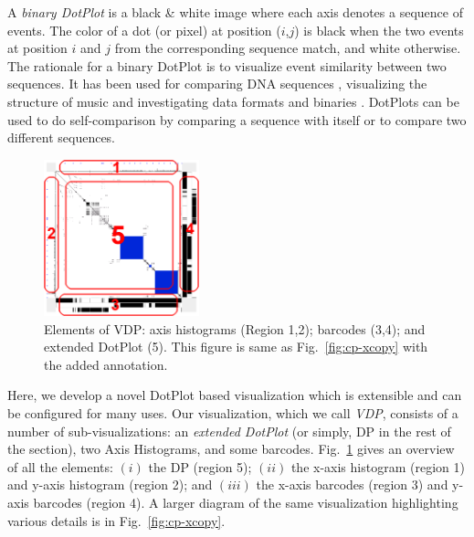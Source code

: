 
A {\em binary DotPlot} is a black \& white image
where each axis denotes a sequence of events.
The color of a dot (or pixel) at position ($i$,$j$) is black
when the two events at position $i$ and $j$ from the corresponding sequence
match, and white otherwise.
The rationale for a binary DotPlot is to visualize event similarity
between two sequences.
It has been used for comparing DNA sequences \cite{maizel1981enhanced},
visualizing the structure of music \cite{foote1999visualizing}
and investigating data formats and binaries \cite{kaminsky2006black}.
DotPlots can be used to do self-comparison
by comparing a sequence with itself or to compare
two different sequences.

\begin{figure}[tb]
\begin{center}
\includegraphics[width=0.4\textwidth]{lviz/elements.png}
\caption{Elements of VDP: axis histograms (Region 1,2);
barcodes (3,4); and extended DotPlot (5). This figure is same as
Fig.~\ref{fig:cp-xcopy} with the added annotation.}
\label{fig:elements}
\end{center}
\end{figure}

Here, we develop a novel DotPlot based visualization which is
extensible and can be configured for many uses.
Our visualization, which we call {\em VDP},
consists of a number of sub-visualizations:
an {\em extended DotPlot} (or simply, DP in the rest of the section), two
Axis Histograms, and some barcodes.
Fig.~\ref{fig:elements} gives an overview of all the elements:
$(i)$ the DP (region 5);
$(ii)$ the x-axis histogram (region 1) and
y-axis histogram (region 2);
and $(iii)$ the x-axis barcodes (region 3) and
y-axis barcodes (region 4).
A larger diagram of the same visualization highlighting various
details is in Fig.~\ref{fig:cp-xcopy}.

